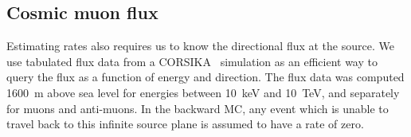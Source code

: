 \subsection{Cosmic muon flux}
Estimating rates also requires us to know the directional flux at the source. We
use tabulated flux data from a CORSIKA~\cite{corsika} simulation as an efficient
way to query the flux as a function of energy and direction. The flux data was
computed \SI{1600}{\metre} above sea level for energies between \SI{10}{\keV}
and \SI{10}{\TeV}, and separately for muons and anti-muons. In the backward MC,
any event which is unable to travel back to this infinite source plane is
assumed to have a rate of zero.

